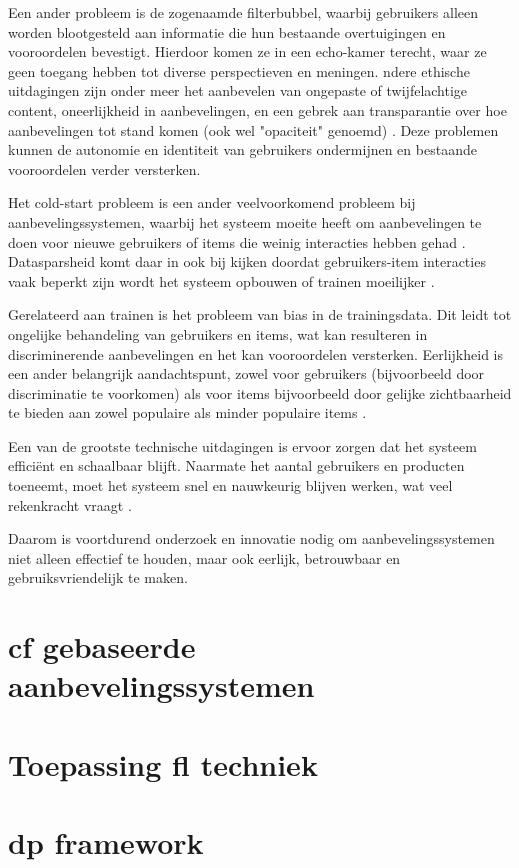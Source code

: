Een ander probleem is de zogenaamde filterbubbel, waarbij gebruikers alleen worden blootgesteld aan informatie die hun bestaande overtuigingen en vooroordelen bevestigt. Hierdoor komen ze in een echo-kamer terecht, waar ze geen toegang hebben tot diverse perspectieven en meningen. ndere ethische uitdagingen zijn onder meer het aanbevelen van ongepaste of twijfelachtige content, oneerlijkheid in aanbevelingen, en een gebrek aan transparantie over hoe aanbevelingen tot stand komen (ook wel "opaciteit" genoemd) \autocite{Milano2020}. Deze problemen kunnen de autonomie en identiteit van gebruikers ondermijnen en bestaande vooroordelen verder versterken.

Het cold-start probleem is een ander veelvoorkomend probleem bij aanbevelingssystemen, waarbij het systeem moeite heeft om aanbevelingen te doen voor nieuwe gebruikers of items die weinig interacties hebben gehad \autocite{Roy2022, Patel2023}. Datasparsheid komt daar in ook bij kijken doordat gebruikers-item interacties vaak beperkt zijn wordt het systeem opbouwen of trainen moeilijker \autocite{Roy2022, Patel2023}.

Gerelateerd aan trainen is het probleem van bias in de trainingsdata. Dit leidt tot ongelijke behandeling van gebruikers en items, wat kan resulteren in discriminerende aanbevelingen en het kan vooroordelen versterken. Eerlijkheid is een ander belangrijk aandachtspunt, zowel voor gebruikers (bijvoorbeeld door discriminatie te voorkomen) als voor items bijvoorbeeld door gelijke zichtbaarheid te bieden aan zowel populaire als minder populaire items \autocite{Wang2024}.

Een van de grootste technische uitdagingen is ervoor zorgen dat het systeem efficiënt en schaalbaar blijft. Naarmate het aantal gebruikers en producten toeneemt, moet het systeem snel en nauwkeurig blijven werken, wat veel rekenkracht vraagt \autocite{Roy2022, Patel2017}.

Daarom is voortdurend onderzoek en innovatie nodig om aanbevelingssystemen niet alleen effectief te houden, maar ook eerlijk, betrouwbaar en gebruiksvriendelijk te maken. 
\section{\ac{cf} gebaseerde aanbevelingssystemen}
\section{Toepassing \ac{fl} techniek}
\section{\ac{dp} framework}
